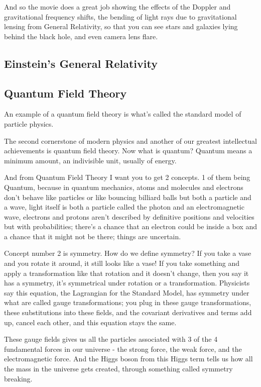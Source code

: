\documentclass[10pt]{amsart}
\begin{document}
And so the movie does a great job showing the effects of the Doppler and gravitational frequency shifts, the bending of light rays due to gravitational lensing from General Relativity, so that you can see stars and galaxies lying behind the black hole, and even camera lens flare. 

\subsection{Einstein's General Relativity}



\subsection{Quantum Field Theory}

An example of a quantum field theory is what's called the standard model of particle physics. 

The second cornerstone of modern physics and another of our greatest intellectual achievements is quantum field theory. Now what is quantum? Quantum means a minimum amount, an indivisible unit, usually of energy.

And from Quantum Field Theory I want you to get 2 concepts. 1 of them being Quantum, because in quantum mechanics, atoms and molecules and electrons don't behave like particles or like bouncing billiard balls but both a particle and a wave, light itself is both a particle called the photon and an electromagnetic wave, electrons and protons aren't described by definitive positions and velocities but with probabilities; there's a chance that an electron could be inside a box and a chance that it might not be there; things are uncertain.

Concept number 2 is symmetry. How do we define symmetry? If you take a vase and you rotate it around, it still looks like a vase! If you take something and apply a transformation like that rotation and it doesn't change, then you say it has a symmetry, it's symmetrical under rotation or a transformation. Physicists say this equation, the Lagrangian for the Standard Model, has symmetry under what are called gauge transformations; you plug in these gauge transformations, these substitutions into these fields, and the covariant derivatives and terms add up, cancel each other, and this equation stays the same.

These gauge fields gives us all the particles associated with 3 of the 4 fundamental forces in our universe - the strong force, the weak force, and the electromagnetic force. And the Higgs boson from this Higgs term tells us how all the mass in the universe gets created, through something called symmetry breaking.
\end{document}
